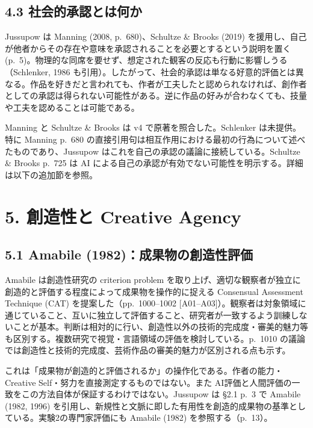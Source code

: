 \documentclass[
  11pt,
  a4paper,
]{article}
\begin{document}
\subsection{4.3
社会的承認とは何か}\label{ux793eux4f1aux7684ux627fux8a8dux3068ux306fux4f55ux304b}

Jussupow は Manning (2008, p.~680)、Schultze \& Brooks (2019)
を援用し、自己が他者からその存在や意味を承認されることを必要とするという説明を置く
(p.~5)。物理的な同席を要せず、想定された観客の反応も行動に影響しうる（Schlenker,
1986
も引用）。したがって、社会的承認は単なる好意的評価とは異なる。作品を好きだと言われても、作者が工夫したと認められなければ、創作者としての承認は得られない可能性がある。逆に作品の好みが合わなくても、技量や工夫を認めることは可能である。

Manning と Schultze \& Brooks は v4 で原著を照合した。Schlenker
は未提供。特に Manning p.~680
の直接引用句は相互作用における最初の行為について述べたものであり、Jussupow
はこれを自己の承認の議論に接続している。Schultze \& Brooks p.~725 は AI
による自己の承認が有効でない可能性を明示する。詳細は以下の追加節を参照。

\section{5. 創造性と Creative
Agency}\label{ux5275ux9020ux6027ux3068-creative-agency}

\subsection{5.1 Amabile
(1982)：成果物の創造性評価}\label{amabile-1982ux6210ux679cux7269ux306eux5275ux9020ux6027ux8a55ux4fa1}

Amabile は創造性研究の criterion problem
を取り上げ、適切な観察者が独立に創造的と評価する程度によって成果物を操作的に捉える
Consensual Assessment Technique (CAT) を提案した（pp.~1000--1002
{[}A01--A03{]}）。観察者は対象領域に通じていること、互いに独立して評価すること、研究者が一致するよう訓練しないことが基本。判断は相対的に行い、創造性以外の技術的完成度・審美的魅力等も区別する。複数研究で視覚・言語領域の評価を検討している。p.~1010
の議論では創造性と技術的完成度、芸術作品の審美的魅力が区別される点も示す。

これは「成果物が創造的と評価されるか」の操作化である。作者の能力・Creative
Self・努力を直接測定するものではない。また
AI評価と人間評価の一致をこの方法自体が保証するわけではない。Jussupow は
§2.1 p.~3 で Amabile (1982, 1996)
を引用し、新規性と文脈に即した有用性を創造的成果物の基準としている。実験2の専門家評価にも
Amabile (1982) を参照する（p.~13）。
\end{document}
